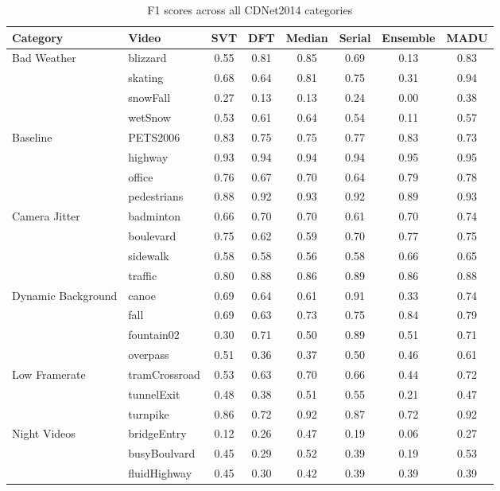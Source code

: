 \begin{table*}[t]
\centering
\caption{F1 scores across all CDNet2014 categories}
\begin{tabular}{llcccccc}
\toprule
Category & Video & SVT & DFT & Median & Serial & Ensemble & MADU \\
\midrule
\multirow{4}{*}{Bad Weather} & blizzard & 0.55 & 0.81 & 0.85 & 0.69 & 0.13 & 0.83 \\
 & skating & 0.68 & 0.64 & 0.81 & 0.75 & 0.31 & 0.94 \\
 & snowFall & 0.27 & 0.13 & 0.13 & 0.24 & 0.00 & 0.38 \\
 & wetSnow & 0.53 & 0.61 & 0.64 & 0.54 & 0.11 & 0.57 \\
\midrule
\multirow{4}{*}{Baseline} & PETS2006 & 0.83 & 0.75 & 0.75 & 0.77 & 0.83 & 0.73 \\
 & highway & 0.93 & 0.94 & 0.94 & 0.94 & 0.95 & 0.95 \\
 & office & 0.76 & 0.67 & 0.70 & 0.64 & 0.79 & 0.78 \\
 & pedestrians & 0.88 & 0.92 & 0.93 & 0.92 & 0.89 & 0.93 \\
\midrule
\multirow{4}{*}{Camera Jitter} & badminton & 0.66 & 0.70 & 0.70 & 0.61 & 0.70 & 0.74 \\
 & boulevard & 0.75 & 0.62 & 0.59 & 0.70 & 0.77 & 0.75 \\
 & sidewalk & 0.58 & 0.58 & 0.56 & 0.58 & 0.66 & 0.65 \\
 & traffic & 0.80 & 0.88 & 0.86 & 0.89 & 0.86 & 0.88 \\
\midrule
\multirow{4}{*}{Dynamic Background} & canoe & 0.69 & 0.64 & 0.61 & 0.91 & 0.33 & 0.74 \\
 & fall & 0.69 & 0.63 & 0.73 & 0.75 & 0.84 & 0.79 \\
 & fountain02 & 0.30 & 0.71 & 0.50 & 0.89 & 0.51 & 0.71 \\
 & overpass & 0.51 & 0.36 & 0.37 & 0.50 & 0.46 & 0.61 \\
\midrule
\multirow{3}{*}{Low Framerate} & tramCrossroad & 0.53 & 0.63 & 0.70 & 0.66 & 0.44 & 0.72 \\
 & tunnelExit & 0.48 & 0.38 & 0.51 & 0.55 & 0.21 & 0.47 \\
 & turnpike & 0.86 & 0.72 & 0.92 & 0.87 & 0.72 & 0.92 \\
\midrule
\multirow{6}{*}{Night Videos} & bridgeEntry & 0.12 & 0.26 & 0.47 & 0.19 & 0.06 & 0.27 \\
 & busyBoulvard & 0.45 & 0.29 & 0.52 & 0.39 & 0.19 & 0.53 \\
 & fluidHighway & 0.45 & 0.30 & 0.42 & 0.39 & 0.39 & 0.39 \\

\end{tabular}
\end{table*}
